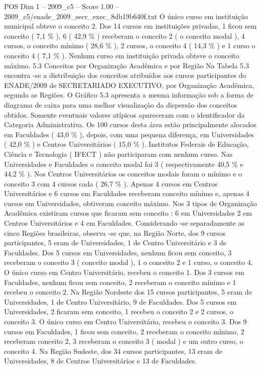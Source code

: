 \begin{textsample}{POS Dim 1 – 2009\_c5 – Score 1.00 – 2009\_c5/enade\_2009\_secr\_exec\_8db19b640f.txt}
O único curso em instituição municipal obteve o conceito 2.
Dos 14 cursos em instituições privadas, 1 ficou sem conceito ( 7,1 \% ), 6 ( 42,9 \% ) receberam o conceito 2 ( o conceito modal ), 4 cursos, o conceito mínimo ( 28,6 \% ), 2 cursos, o conceito 4 ( 14,3 \% ) e 1 curso o conceito 4 ( 7,1 \% ).
Nenhum curso em instituição privada obteve o conceito máximo. 5.3 Conceitos por Organização Acadêmica e por Região Na Tabela 5.3 encontra -se a distribuição dos conceitos atribuídos aos cursos participantes do ENADE/2009 de SECRETARIADO EXECUTIVO, por Organização Acadêmica, segundo as Regiões.
O Gráfico 5.3 apresenta a mesma informação sob a forma de diagrama de caixa para uma melhor visualização da dispersão dos conceitos obtidos.
Somente eventuais valores atípicos apareceram com o identificador da Categoria Administrativa.
Os 100 cursos desta área estão principalmente alocados em Faculdades ( 43,0 \% ), depois, com uma pequena diferença, em Universidades ( 42,0 \% ) e Centros Universitários ( 15,0 \% ).
Institutos Federais de Educação, Ciência e Tecnologia ( IFECT ) não participaram com nenhum curso.
Nas Universidades e Faculdades o conceito modal foi 3 ( respectivamente 40,5 \% e 44,2 \% ).
Nos Centros Universitários os conceitos modais foram o mínimo e o conceito 3 com 4 cursos cada ( 26,7 \% ).
Apenas 4 cursos em Centros Universitários e 6 cursos em Faculdades receberam conceito mínimo e, apenas 4 cursos em Universidades, obtiveram conceito máximo.
Nos 3 tipos de Organização Acadêmica existiram cursos que ficaram sem conceito : 6 em Universidades 2 em Centros Universitários e 4 em Faculdades.
Considerando -se separadamente as cinco Regiões brasileiras, observa -se que, na Região Norte, dos 9 cursos participantes, 5 eram de Universidades, 1 de Centro Universitário e 3 de Faculdades.
Dos 5 cursos em Universidades, nenhum ficou sem conceito, 3 receberam o conceito 3 ( conceito modal ), 1 o conceito 2 e 1 curso, o conceito 4.
O único curso em Centro Universitário, recebeu o conceito 1.
Dos 3 cursos em Faculdades, nenhum ficou sem conceito, 2 receberam o conceito mínimo e 1 recebeu o conceito 2.
Na Região Nordeste dos 15 cursos participantes, 5 eram de Universidades, 1 de Centro Universitário, 9 de Faculdades.
Dos 5 cursos em Universidades, 2 ficaram sem conceito, 1 recebeu o conceito 2 e 2 cursos, o conceito 3.
O único curso em Centro Universitário, recebeu o conceito 3.
Dos 9 cursos em Faculdades, 1 ficou sem conceito, 2 receberam o conceito mínimo, 2 receberam conceito 2, 3 receberam o conceito 3 ( modal ) e um outro curso, o conceito 4.
Na Região Sudeste, dos 34 cursos participantes, 13 eram de Universidades, 8 de Centros Universitários e 13 de Faculdades.

\end{textsample}
